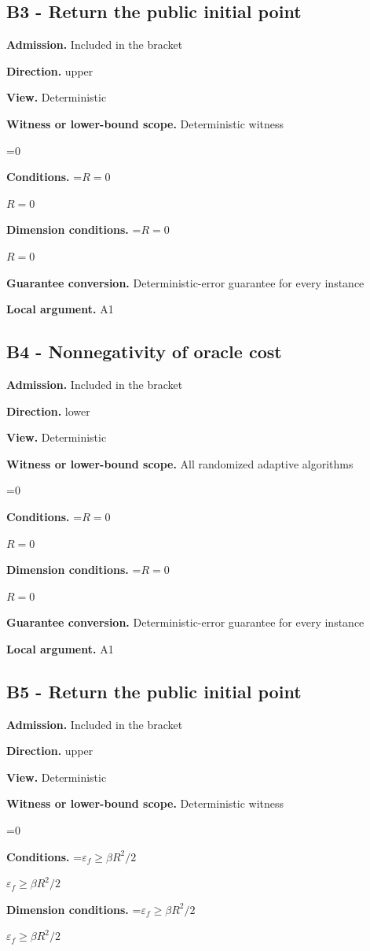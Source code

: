 \documentclass[10pt,a4paper]{article}
\newcommand{\AtlasMath}[1]{\par\begingroup\centering\setbox0=\hbox{$\displaystyle #1$}\ifdim\wd0>1.4\linewidth\typeout{ATLAS WIDE FORMULA: \the\wd0}\fi\ifdim\wd0>\linewidth\resizebox{\linewidth}{!}{\box0}\else\box0\fi\par\endgroup}
\newcommand{\AtlasInlineMath}[1]{\begingroup\setbox0=\hbox{$#1$}\ifdim\wd0>.4\linewidth\endgroup\AtlasMath{#1}\else\endgroup$#1$\fi}
\begin{document}
\subsection{B3 - Return the public initial point}
\textbf{Admission.} Included in the bracket

\textbf{Direction.} upper

\textbf{View.} Deterministic

\textbf{Witness or lower-bound scope.} Deterministic witness

\AtlasMath{0}
\textbf{Conditions.} \AtlasInlineMath{R=0}

\textbf{Dimension conditions.} \AtlasInlineMath{R=0}

\textbf{Guarantee conversion.} Deterministic-error guarantee for every instance

\textbf{Local argument.} A1

\subsection{B4 - Nonnegativity of oracle cost}
\textbf{Admission.} Included in the bracket

\textbf{Direction.} lower

\textbf{View.} Deterministic

\textbf{Witness or lower-bound scope.} All randomized adaptive algorithms

\AtlasMath{0}
\textbf{Conditions.} \AtlasInlineMath{R=0}

\textbf{Dimension conditions.} \AtlasInlineMath{R=0}

\textbf{Guarantee conversion.} Deterministic-error guarantee for every instance

\textbf{Local argument.} A1

\subsection{B5 - Return the public initial point}
\textbf{Admission.} Included in the bracket

\textbf{Direction.} upper

\textbf{View.} Deterministic

\textbf{Witness or lower-bound scope.} Deterministic witness

\AtlasMath{0}
\textbf{Conditions.} \AtlasInlineMath{\varepsilon_f\ge\beta R^2/2}

\textbf{Dimension conditions.} \AtlasInlineMath{\varepsilon_f\ge\beta R^2/2}
\end{document}

